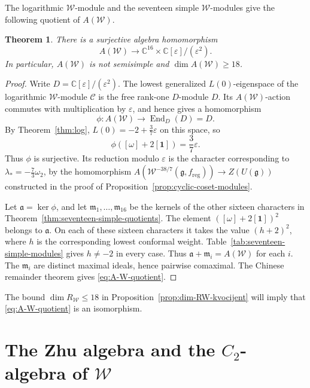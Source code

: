 \documentclass[11pt]{amsart}
\numberwithin{equation}{section}
\newtheorem{theorem}{Theorem}[section]
\theoremstyle{definition}
\theoremstyle{remark}
\newcommand{\g}{\mathfrak g}
\newcommand{\one}{\mathbf1}
\begin{document}
The logarithmic $\mathcal W$-module and the seventeen simple
$\mathcal W$-modules give the following quotient of $A(\mathcal W)$.

\begin{theorem}\label{thm:A-W-quotient}
	There is a surjective algebra homomorphism
	\begin{equation}\label{eq:A-W-quotient}
		A(\mathcal W)\longrightarrow
		\mathbb C^{16}\times\mathbb C[\varepsilon]/(\varepsilon^2).
	\end{equation}
	In particular, $A(\mathcal W)$ is not semisimple and
	$\dim A(\mathcal W)\geq18$.
\end{theorem}
\begin{proof}
	Write $D=\mathbb C[\varepsilon]/(\varepsilon^2)$.
	The lowest generalized $L(0)$-eigenspace of the logarithmic $\mathcal W$-module
	$\mathcal C$ is the free rank-one $D$-module $D$.
	Its $A(\mathcal W)$-action commutes with multiplication by
	$\varepsilon$, and hence gives a homomorphism
	\[
	\phi:A(\mathcal W)\longrightarrow
	\operatorname{End}_D(D)=D.
	\]
	By Theorem~\ref{thm:log}, $L(0)=-2+\frac37\varepsilon$ on this space, so
	\[
	\phi([\omega]+2[\one])=\frac37\varepsilon.
	\]
	Thus $\phi$ is surjective. Its reduction modulo $\varepsilon$
	is the character corresponding to
	$\lambda_*=-\frac73\omega_2$, by the homomorphism
	$A(\mathcal W^{-38/7}(\g,f_{\mathrm{reg}}))\longrightarrow Z(U(\mathfrak{g}))$ constructed in the proof of
	Proposition~\ref{prop:cyclic-coset-modules}.
	
	Let $\mathfrak a=\ker\phi$, and let
	$\mathfrak m_1,\ldots,\mathfrak m_{16}$ be the kernels of the
	other sixteen characters in
	Theorem~\ref{thm:seventeen-simple-quotients}.
	The element $([\omega]+2[\one])^2$ belongs to $\mathfrak a$.
	On each of these sixteen characters it takes the value $(h+2)^2$,
	where $h$ is the corresponding lowest conformal weight.
	Table~\ref{tab:seventeen-simple-modules} gives $h\ne-2$ in every case.
	Thus $\mathfrak a+\mathfrak m_i=A(\mathcal W)$ for each $i$.
	The $\mathfrak m_i$ are distinct maximal ideals, hence pairwise
	comaximal. The Chinese remainder theorem gives \eqref{eq:A-W-quotient}.
\end{proof}

The bound $\dim R_{\mathcal W}\leq18$ in Proposition~\ref{prop:dim-RW-kvocijent} will imply that
\eqref{eq:A-W-quotient} is an isomorphism.


\section{\texorpdfstring{The Zhu algebra and the $C_2$-algebra of
 $\mathcal W$}{The Zhu algebra and the C2-algebra of W}}
\label{sec:singular-relations}
\end{document}
